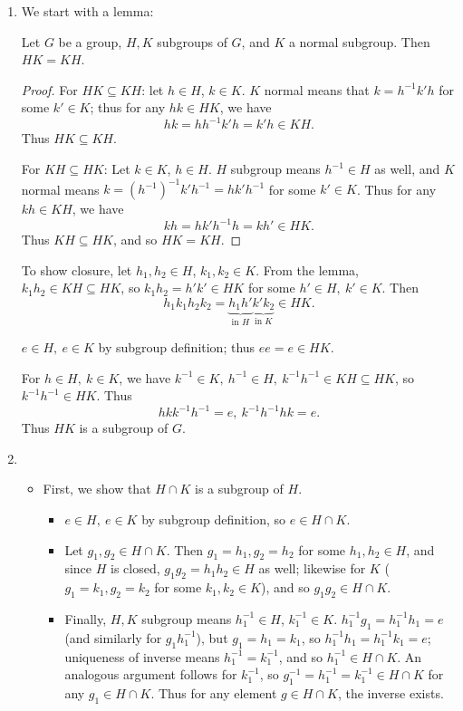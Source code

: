 \documentclass{homework}
\begin{document}
\begin{solution}
  \begin{enumerate}[label=(\alph*)]
    \item We start with a lemma:
      \begin{lemma}{}
        Let $G$ be a group, $H,K$ subgroups of $G$, and $K$ a normal subgroup. Then $HK=KH$.
      \end{lemma}
      \begin{proof}[Proof]
        For $HK\subseteq KH$: let $h\in H$, $k\in K$. $K$ normal means that $k=h^{-1}k'h$ for some
        $k'\in K$; thus for any $hk\in HK$, we have \[
          hk=hh^{-1}k'h=k'h\in KH
        .\] Thus $HK\subseteq KH$.
        
        For $KH\subseteq HK$: Let $k\in K$, $h\in H$. $H$ subgroup means $h^{-1}\in H$ as well, and
        $K$ normal means $k=(h^{-1})^{-1}k'h^{-1}=hk'h^{-1}$ for some $k'\in K$. Thus for any $kh\in
        KH$, we have \[
          kh=hk'h^{-1}h=kh'\in HK
        .\] Thus $KH\subseteq HK$, and so $HK=KH$.
      \end{proof}

      To show closure, let $h_1,h_2\in H$, $k_1,k_2\in K$. From the lemma, $k_1h_2\in KH\subseteq
      HK$, so $k_1h_2=h'k'\in HK$ for some $h'\in H,\ k'\in K$. Then \[
        h_1k_1h_2k_2=\underbrace{h_1h'}_\text{in $H$}\underbrace{k'k_2}_\text{in $K$}\in HK
      .\] 

      $e\in H,\ e\in K$ by subgroup definition; thus $ee=e\in HK$.

      For $h\in H,\ k\in K$, we have $k^{-1}\in K,\ h^{-1}\in H,\ k^{-1}h^{-1}\in KH\subseteq HK$,
      so $k^{-1}h^{-1}\in HK$. Thus \[
        hkk^{-1}h^{-1}=e,\ k^{-1}h^{-1}hk=e
      .\] Thus $HK$ is a subgroup of $G$.
      
    \item 
      \begin{itemize}
        \item First, we show that $H\cap K$ is a subgroup of $H$.
          \begin{itemize}
            \item $e\in H,\ e\in K$ by subgroup definition, so $e\in H\cap K$.
            \item Let $g_1, g_2\in H\cap K$. Then $g_1=h_1,g_2=h_2$ for some $h_1,h_2\in H$, and
              since $H$ is closed, $g_1g_2=h_1h_2\in H$ as well; likewise for $K$ ($g_1=k_1,g_2=k_2$
              for some $k_1,k_2\in K$), and so $g_1g_2\in H\cap K$.
            \item Finally, $H, K$ subgroup means $h_1^{-1}\in H$, $k_1^{-1}\in K$.
              $h_1^{-1}g_1=h_1^{-1}h_1=e$ (and similarly for $g_1h_1^{-1}$), but $g_1=h_1=k_1$, so
              $h_1^{-1}h_1=h_1^{-1}k_1=e$; uniqueness of inverse means $h_1^{-1}=k_1^{-1}$, and so
              $h_1^{-1}\in H\cap K$. An analogous argument follows for $k_1^{-1}$, so
              $g_1^{-1}=h_1^{-1}=k_1^{-1}\in H\cap K$ for any $g_1\in H\cap K$. Thus for any element
              $g\in H\cap K$, the inverse exists.
          \end{itemize}  


\end{itemize}
\end{enumerate}
\end{solution}
\end{document}
